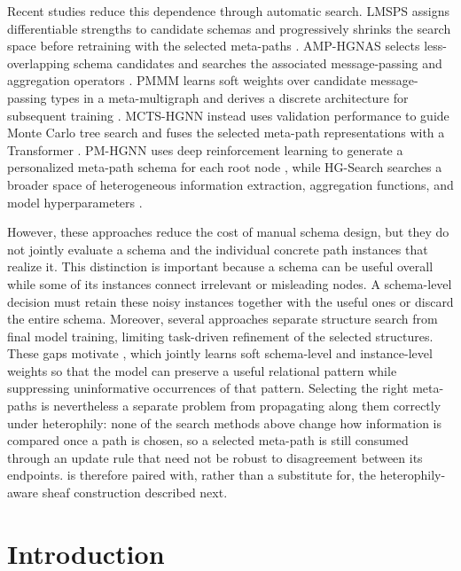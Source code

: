 Recent studies reduce this dependence through automatic search. LMSPS assigns differentiable
strengths to candidate schemas and progressively shrinks the search space before retraining with
the selected meta-paths \cite{li2024lmsps}. AMP-HGNAS selects less-overlapping schema candidates
and searches the associated message-passing and aggregation operators \cite{li2026amphgnas}.
PMMM learns soft weights over candidate message-passing types in a meta-multigraph and derives a
discrete architecture for subsequent training \cite{li2023pmmm}. MCTS-HGNN instead uses validation
performance to guide Monte Carlo tree search and fuses the selected meta-path representations with
a Transformer \cite{zhang2026mctshgnn}. PM-HGNN uses deep reinforcement learning to generate a
personalized meta-path schema for each root node \cite{zhong2022pmhgnn}, while HG-Search searches a
broader space of heterogeneous information extraction, aggregation functions, and model
hyperparameters \cite{sun2025hgsearch}.
\cite{zhu2020beyond} 

However, these approaches reduce the cost of manual schema design, but they do not jointly
evaluate a schema and the individual concrete path instances that realize it. This distinction is
important because a schema can be useful overall while some of its instances connect irrelevant
or misleading nodes. A schema-level decision must retain these noisy instances together with the
useful ones or discard the entire schema. Moreover, several approaches separate structure search
from final model training, limiting task-driven refinement of the selected structures. These gaps
motivate \ampss{}, which jointly learns soft schema-level and instance-level weights so that the
model can preserve a useful relational pattern while suppressing uninformative occurrences of that
pattern. Selecting the right meta-paths is nevertheless a separate problem from propagating along
them correctly under heterophily: none of the search methods above change how information is
compared once a path is chosen, so a selected meta-path is still consumed through an update rule
that need not be robust to disagreement between its endpoints. \ampss{} is therefore paired with,
rather than a substitute for, the heterophily-aware sheaf construction described next.



\section{Introduction}
\label{sec:introduction}


